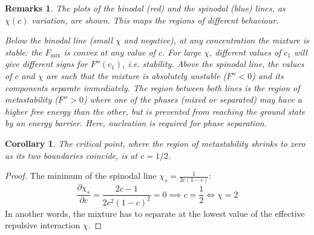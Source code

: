 \documentclass[a4paper]{article}
\newtheorem{remarks}{Remarks}[section]
\theoremstyle{new}
\newtheorem{cor}{Corollary}[section]
\begin{document}
\begin{remarks}
The plots of the binodal (red) and the spinodal (blue) lines, as $\chi(c)$ variation, are shown. This maps the regions of different behaviour. 
\begin{center}
\end{center}
Below the binodal line (small $\chi$ and negative), at any concentration the mixture is stable: the $F_{\text{mix}}$ is convex at any value of $c$. For large $\chi$, different values of $c_1$ will give different signs for $F''(c_1)$, i.e. stability. Above the spinodal line, the values of $c$ and $\chi$ are such that the mixture is absolutely unstable ($F''<0$) and its components separate immediately. The region between both lines is the region of metastability ($F''>0$) where one of the phases (mixed or separated) may have a higher free energy than the other, but is prevented from reaching the ground state by an energy barrier. Here, nucleation is required for phase separation.
\end{remarks}
\begin{cor}
The critical point, where the region of metastability shrinks to zero as its two boundaries coincide, is at $c=1/2$.
\end{cor}
\begin{proof}
The minimum of the spinodal line $\chi_s=\frac{1}{2c(1-c)}$:
$$\frac{\partial\chi_s}{\partial c}=\frac{2c-1}{2c^2(1-c)^2}=0\implies c=\frac{1}{2}\iff\chi=2$$
In another words, the mixture has to separate at the lowest value of the effective repulsive interaction $\chi$.
\end{proof}
\end{document}
